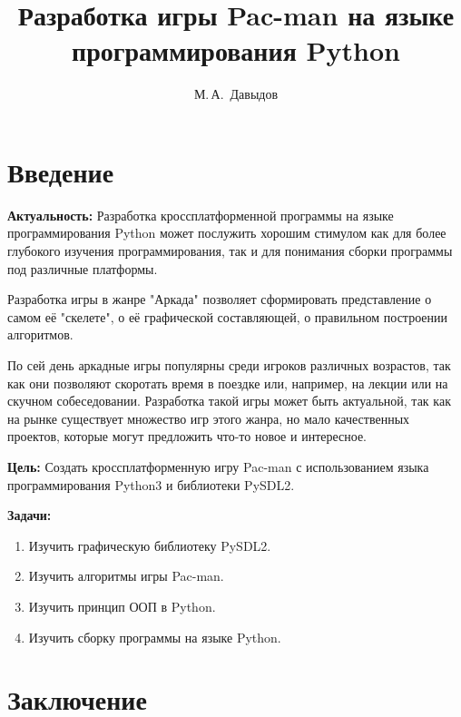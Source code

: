 \documentclass[14pt, oneside]{altsu-report}
\title{Разработка игры Pac-man на языке программирования Python}
\author{М.\,А.~Давыдов}
\institute{Институт цифровых технологий, электроники и физики}
\date{\the\year}
\begin{document}
\maketitle

\setcounter{page}{2}
\makeabstract
\tableofcontents

\chapter*{Введение}

\textbf{Актуальность:}
Разработка кроссплатформенной программы на языке программирования Python может послужить хорошим стимулом как для более глубокого изучения программирования, так и для понимания сборки программы под различные платформы.

Разработка игры в жанре "Аркада" позволяет сформировать представление о самом её "скелете", о её графической составляющей, о правильном построении алгоритмов.

По сей день аркадные игры популярны среди игроков различных возрастов, так как они позволяют скоротать время в поездке или, например, на лекции или на скучном собеседовании. Разработка такой игры может быть актуальной, так как на рынке существует множество игр этого жанра, но мало качественных проектов, которые могут предложить что-то новое и интересное.

\textbf{Цель:}
Создать кроссплатформенную игру Pac-man с использованием языка программирования Python3 и библиотеки PySDL2.

\textbf{Задачи:}
\begin{enumerate}
	\item Изучить графическую библиотеку PySDL2.
	\item Изучить алгоритмы игры Pac-man.
	\item Изучить принцип ООП в Python.
	\item Изучить сборку программы на языке Python.
\end{enumerate}


 


\chapter*{Заключение}
\end{document}
